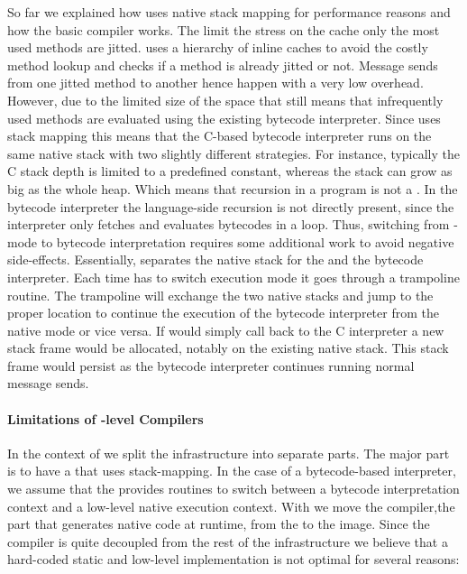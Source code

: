\noindent So far we explained how \Cog uses native stack mapping for performance reasons and how the basic \JIT compiler works.
The limit the stress on the \CPU cache only the most used methods are jitted.
\Cog uses a hierarchy of inline caches to avoid the costly method lookup and checks if a method is already jitted or not.
Message sends from one jitted method to another hence happen with a very low overhead.
However, due to the limited size of the \JIT space that still means that infrequently used methods are evaluated using the existing bytecode interpreter.
Since \Cog uses stack mapping this means that the C-based bytecode interpreter runs on the same native stack with two slightly different strategies.
For instance, typically the C stack depth is limited to a predefined constant, whereas the \PH stack can grow as big as the whole heap.
Which means that recursion in a \PH program is not a .
In the bytecode interpreter the language-side recursion is not directly present, since the interpreter only fetches and evaluates bytecodes in a loop.
Thus, switching from \JIT-mode to bytecode interpretation requires some additional work to avoid negative side-effects.
Essentially, \Cog separates the native stack for the \JIT and the bytecode interpreter.
Each time \Cog has to switch execution mode it goes through a trampoline routine.
The trampoline will exchange the two native stacks and jump to the proper location to continue the execution of the bytecode interpreter from the native \JIT mode or vice versa.
If \Cog would simply call back to the C interpreter a new stack frame would be allocated, notably on the existing native \JIT stack.
This stack frame would persist as the bytecode interpreter continues running normal \PH message sends.

\paragraph{Limitations of \VM-level \JIT Compilers}
In the context of \NBJ we split the \JIT infrastructure into separate parts.
The major part is to have a \VM that uses stack-mapping.
In the case of a bytecode-based interpreter, we assume that the \VM provides routines to switch between a bytecode interpretation context and a low-level native execution context.
With \NBJ we move the \JIT compiler,the part that generates native code at runtime, from the \VM to the image.%
 Since the \JIT compiler is quite decoupled from the rest of the \JIT infrastructure we believe that a hard-coded static and low-level implementation is not optimal for several reasons:

